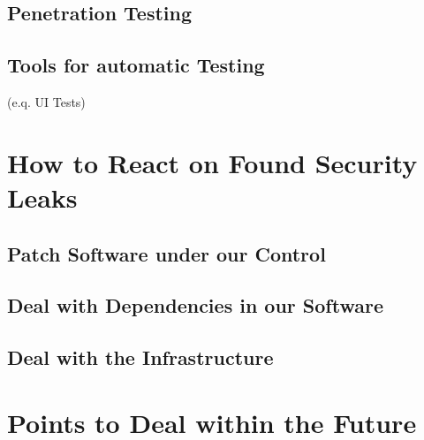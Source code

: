 \subsection{Penetration Testing}
\subsection{Tools for automatic Testing}
(e.q. UI Tests)
\section{How to React on Found Security Leaks}
\subsection{Patch Software under our Control}
\subsection{Deal with Dependencies in our Software}
\subsection{Deal with the Infrastructure}
\section{Points to Deal within the Future}
